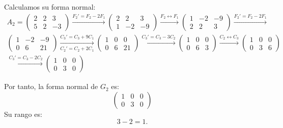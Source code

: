 \begin{ejercicio}
\begin{enumerate}
        Calculamos su forma normal:
        \begin{multline*}
            A_2 = \begin{pmatrix}
                2 & 2 & 3 \\
                5 & 2 & -3
            \end{pmatrix}
            \xrightarrow{F_2' = F_2-2F_1}
            \begin{pmatrix}
                2 & 2 & 3 \\
                1 & -2 & -9
            \end{pmatrix}
            \xrightarrow{F_2\leftrightarrow F_1}
            \begin{pmatrix}
                1 & -2 & -9 \\
                2 & 2 & 3
            \end{pmatrix}
            \xrightarrow{F_2' = F_2-2F_1}\\
            \begin{pmatrix}
                1 & -2 & -9 \\
                0 & 6 & 21
            \end{pmatrix}
            \xrightarrow[C_2' = C_2+2C_1]{C_3' = C_3+9C_1}
            \begin{pmatrix}
                1 & 0 & 0 \\
                0 & 6 & 21
            \end{pmatrix}
            \xrightarrow{C_3' = C_3-3C_2}
            \begin{pmatrix}
                1 & 0 & 0 \\
                0 & 6 & 3
            \end{pmatrix}
            \xrightarrow{C_2\leftrightarrow C_3}
            \begin{pmatrix}
                1 & 0 & 0 \\
                0 & 3 & 6
            \end{pmatrix}\\
            \xrightarrow{C_3' = C_3-2C_2}
            \begin{pmatrix}
                1 & 0 & 0 \\
                0 & 3 & 0
            \end{pmatrix}
        \end{multline*}

        Por tanto, la forma normal de $G_2$ es:
        \begin{equation*}
            \begin{pmatrix}
                1 & 0 & 0 \\
                0 & 3 & 0
            \end{pmatrix}
        \end{equation*}
        Su rango es:
        \begin{equation*}
            3-2= 1.
        \end{equation*}


\end{enumerate}
\end{ejercicio}

